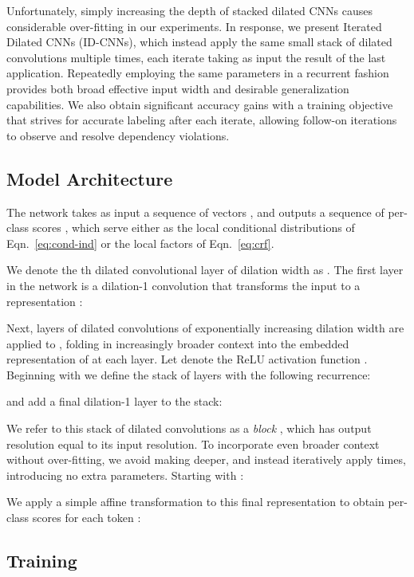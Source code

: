 \documentclass[11pt,letterpaper]{article}
\begin{document}
Unfortunately, simply increasing the depth of stacked dilated CNNs causes considerable over-fitting in our experiments. In response, we present Iterated Dilated CNNs (ID-CNNs), which instead apply the same small stack of dilated convolutions multiple times, each iterate taking as input the result of the last application. Repeatedly employing the same parameters in a recurrent fashion provides both broad effective input width and desirable generalization capabilities. We also obtain significant accuracy gains with a training objective that strives for accurate labeling after each iterate, allowing follow-on iterations to observe and resolve dependency violations.



\subsection{Model Architecture\label{model-section}}
The network takes as input a sequence of  vectors , and outputs a sequence of per-class scores , which serve either as the local conditional distributions of Eqn.~\eqref{eq:cond-ind} or the local factors  of Eqn.~\eqref{eq:crf}. 





We denote the th dilated convolutional layer of dilation width  as . The first layer in the network is a dilation-1 convolution  that transforms the input to a representation :

Next,  layers of dilated convolutions of exponentially increasing dilation width are applied to , folding in increasingly broader context into the embedded representation of  at each layer. Let  denote the ReLU activation function \citep{glorot2011deep}. Beginning with  we define the stack of layers with the following recurrence:

and add a final dilation-1 layer to the stack:

We refer to this stack of dilated convolutions as a \emph{block} , which has output resolution equal to its input resolution. To incorporate even broader context without over-fitting, we avoid making  deeper, and instead iteratively apply   times, introducing no extra parameters. Starting with :

We apply a simple affine transformation  to this final representation to obtain per-class scores for each token :



%
 
\subsection{Training}
\end{document}
